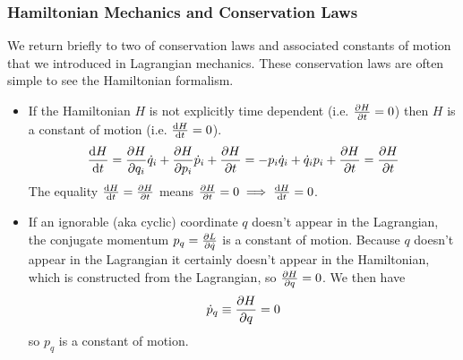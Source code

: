 \documentclass[11pt, a4paper]{article}
\begin{document}
\subsubsection{Hamiltonian Mechanics and Conservation Laws}
We return briefly to two of conservation laws and associated constants of motion that we introduced in Lagrangian mechanics. These conservation laws are often simple to see the Hamiltonian formalism.
\begin{itemize}
	\item If the Hamiltonian $ H $ is not explicitly time dependent (i.e. $ \pdv{H}{t} = 0 $) then $ H $ is a constant of motion (i.e. $ \dv{H}{t} = 0 $).
	\begin{align*}
		\dv{H}{t} = \pdv{H}{q_{i}} \dot{q}_{i} + \pdv{H}{p_{i}} \dot{p}_{i} + \pdv{H}{t} = -p_{i} \dot{q}_{i} + \dot{q}_{i} p_{i} + \pdv{H}{t} = \pdv{H}{t} 
	\end{align*}
	The equality $ \dv{H}{t} = \pdv{H}{t} $ means $ \pdv{H}{t} = 0 \implies  \dv{H}{t} = 0 $. 
	
	\item If an ignorable (aka cyclic) coordinate $ q $ doesn't appear in the Lagrangian, the conjugate momentum $ p_{q} = \pdv{L}{\dot{q}} $ is a constant of motion. Because $ q $ doesn't appear in the Lagrangian it certainly doesn't appear in the Hamiltonian, which is constructed from the Lagrangian, so $ \pdv{H}{q} = 0 $. We then have
	\begin{equation*}
		\dot{p}_{q} \equiv \pdv{H}{q} = 0
	\end{equation*}
	so $ p_{q} $ is a constant of motion.
\end{itemize}
\end{document}
